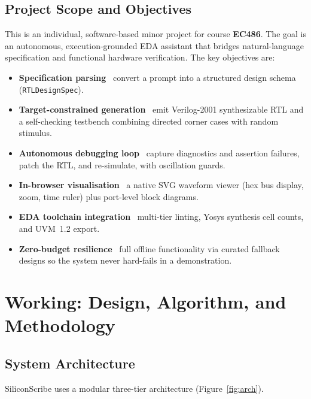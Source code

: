 \documentclass[11pt,a4paper]{article}
\begin{document}
\subsection{Project Scope and Objectives}
This is an individual, software-based minor project for course \textbf{EC486}. The
goal is an autonomous, execution-grounded EDA assistant that bridges natural-language
specification and functional hardware verification. The key objectives are:

\begin{itemize}
\item \textbf{Specification parsing} \textemdash\ convert a prompt into a structured design
schema (\texttt{RTLDesignSpec}).
\item \textbf{Target-constrained generation} \textemdash\ emit Verilog-2001 synthesizable RTL
and a self-checking testbench combining directed corner cases with random stimulus.
\item \textbf{Autonomous debugging loop} \textemdash\ capture diagnostics and assertion
failures, patch the RTL, and re-simulate, with oscillation guards.
\item \textbf{In-browser visualisation} \textemdash\ a native SVG waveform viewer (hex bus
display, zoom, time ruler) plus port-level block diagrams.
\item \textbf{EDA toolchain integration} \textemdash\ multi-tier linting, Yosys synthesis
cell counts, and UVM~1.2 export.
\item \textbf{Zero-budget resilience} \textemdash\ full offline functionality via curated
fallback designs so the system never hard-fails in a demonstration.
\end{itemize}

\section{Working: Design, Algorithm, and Methodology}
\label{sec:working}

\subsection{System Architecture}
SiliconScribe uses a modular three-tier architecture (Figure~\ref{fig:arch}).
\end{document}
